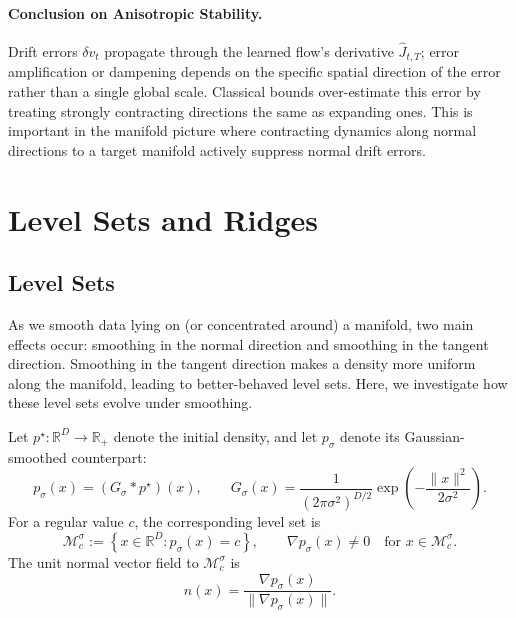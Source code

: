 \documentclass{article}
\newcommand{\R}{\mathbb{R}}
\newcommand{\M}{\mathcal{M}}
\theoremstyle{plain}
\theoremstyle{definition}
\theoremstyle{remark}
\begin{document}
\paragraph{Conclusion on Anisotropic Stability.} Drift errors $\delta v_t$ propagate through the learned flow's derivative $\hat{J}_{t, T}$; error amplification or dampening depends on the specific spatial direction of the error rather than a single global scale. Classical bounds over-estimate this error by treating strongly contracting directions the same as expanding ones. This is important in the manifold picture where contracting dynamics along normal directions to a target manifold actively suppress normal drift errors.
\newpage

\section{Level Sets and Ridges}
\label{sec:ridges}

\subsection{Level Sets}
\label{sec:level_sets}

As we smooth data lying on (or concentrated around) a manifold, two main effects occur: smoothing in the normal direction and smoothing in the tangent direction. Smoothing in the tangent direction makes a density more uniform along the manifold, leading to better-behaved level sets. Here, we investigate how these level sets evolve under smoothing.

Let $p^\star : \R^D \to \R_+$ denote the initial density, and let $p_{\sigma}$ denote its Gaussian-smoothed counterpart:
\begin{equation}
    p_{\sigma}(x)
    =
    (G_{\sigma} * p^\star)(x),
    \qquad
    G_{\sigma}(x)
    =
    \frac{1}{(2\pi\sigma^2)^{D/2}}
    \exp\!\left(-\frac{\|x\|^2}{2\sigma^2}\right).
\end{equation}
For a regular value $c$, the corresponding level set is
\begin{equation}
    \M_c^\sigma
    :=
    \left\{x \in \R^D : p_{\sigma}(x) = c\right\},
    \qquad
    \nabla p_{\sigma}(x) \neq 0
    \quad
    \text{for } x \in \M_c^\sigma.
\end{equation}
The unit normal vector field to $\M_c^\sigma$ is
\begin{equation}
    n(x)
    =
    \frac{\nabla p_{\sigma}(x)}
    {\|\nabla p_{\sigma}(x)\|}.
\end{equation}
\end{document}
